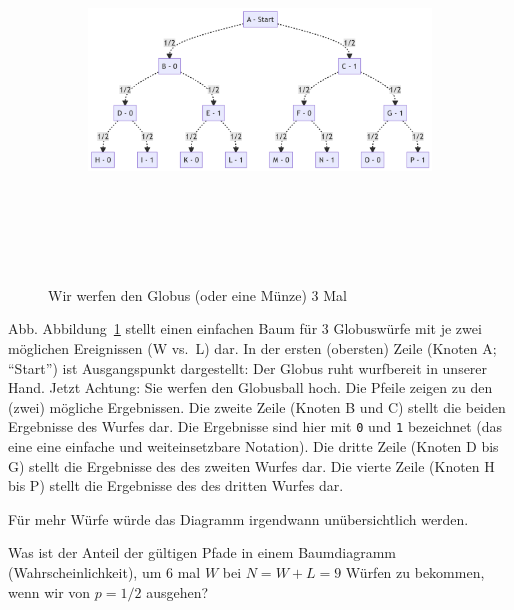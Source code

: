 \documentclass[
  a4paper,
  DIV=11]{scrreprt}
\theoremstyle{definition}
\theoremstyle{remark}
\begin{document}
\begin{figure}

{\centering 

\begin{figure}[H]

{\centering \includegraphics[width=7.81in,height=3.7in]{./Globusversuch_files/figure-latex/mermaid-figure-2.png}

}

\end{figure}

}

\caption{\label{fig-binom1a}Wir werfen den Globus (oder eine Münze) 3
Mal}

\end{figure}

Abb. Abbildung~\ref{fig-binom1a} stellt einen einfachen Baum für 3
Globuswürfe mit je zwei möglichen Ereignissen (W vs.~L) dar. In der
ersten (obersten) Zeile (Knoten A; ``Start'') ist Ausgangspunkt
dargestellt: Der Globus ruht wurfbereit in unserer Hand. Jetzt Achtung:
Sie werfen den Globusball hoch. Die Pfeile zeigen zu den (zwei) mögliche
Ergebnissen. Die zweite Zeile (Knoten B und C) stellt die beiden
Ergebnisse des Wurfes dar. Die Ergebnisse sind hier mit \texttt{0} und
\texttt{1} bezeichnet (das eine eine einfache und weiteinsetzbare
Notation). Die dritte Zeile (Knoten D bis G) stellt die Ergebnisse des
des zweiten Wurfes dar. Die vierte Zeile (Knoten H bis P) stellt die
Ergebnisse des des dritten Wurfes dar.

Für mehr Würfe würde das Diagramm irgendwann unübersichtlich werden.

Was ist der Anteil der gültigen Pfade in einem Baumdiagramm
(Wahrscheinlichkeit), um 6 mal \(W\) bei \(N=W+L=9\) Würfen zu bekommen,
wenn wir von \(p=1/2\) ausgehen?
\end{document}

